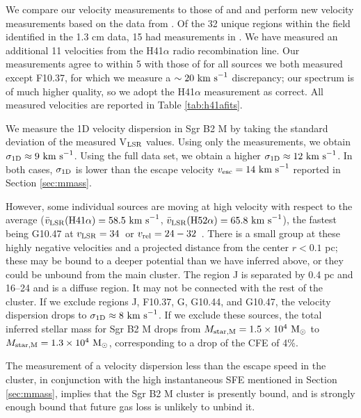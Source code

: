 \documentclass[twocolumn]{aastex62}
\begin{document}
We compare our velocity measurements to those of \citet{De-Pree2011a} and
\citet{De-Pree1996a} and perform  new velocity measurements based on the
data from \citet{Ginsburg2018a}.  Of the 32 unique \hii regions within the field
identified in the \citet{Gaume1995a} 1.3 cm data, 
15 had measurements in \citet{De-Pree2011a}.  We have measured an additional 11
velocities from the H41$\alpha$ radio recombination line.  Our measurements
agree to within 5 \kms with those of \citet{De-Pree2011a} for all sources we
both measured except F10.37, for which we measure a $\sim20~\textrm{km~s}^{-1}$ discrepancy;
our spectrum is of much higher quality, so we adopt the H41$\alpha$ measurement
as correct.  All measured velocities are reported in Table \ref{tab:h41afits}.

We measure the 1D velocity dispersion in Sgr B2 M by taking the standard
deviation of the measured V$_{\rm LSR}$ values.  Using only the
\citet{De-Pree2011a} measurements, we obtain $\sigma_{\rm 1D}\approx9~\textrm{km~s}^{-1}$.  Using
the full data set, we obtain a higher $\sigma_{\rm 1D}\approx12~\textrm{km~s}^{-1}$.  In both
cases, $\sigma_{\rm 1D}$ is  lower than the escape velocity
$v_{\rm esc}=14~\textrm{km~s}^{-1}$ reported in Section \ref{sec:mmass}.

However, some individual sources are moving at high velocity with respect to
the average ($\bar{v}_{\rm LSR}(\rm H41\alpha) = 58.5~\textrm{km~s}^{-1}$, $\bar{v}_{\rm LSR}(\rm H52\alpha)
= 65.8~\textrm{km~s}^{-1}$), the fastest being G10.47 at $v_{\rm LSR}=34$~\kms or
$v_{\rm rel}=24-32$~\kms.  There is a small group at these highly negative
velocities and a projected distance from the center $r<0.1$ pc; these may be
bound to a deeper potential than we have inferred above, or they could be unbound
from the main cluster.
The \hii region J is separated by 0.4 pc and 16--24 \kms and is a diffuse \hii
region.  It may not be connected with the rest of the cluster.
If we exclude regions J, F10.37, G, G10.44, and G10.47, the velocity dispersion
drops to $\sigma_{\rm 1D}\approx8~\textrm{km~s}^{-1}$.  If we exclude these sources, the total
inferred stellar mass for Sgr B2 M drops from $M_{\rm star,M} = 1.5\times10^{4}~\mathrm{M}_{\odot}$ to
$M_{\rm star,M}=1.3\times10^{4}~\mathrm{M}_{\odot}$, corresponding to a drop of the CFE of 4\%.

The measurement of a velocity dispersion less than the escape speed in the cluster,
in conjunction with the high instantaneous SFE mentioned in Section \ref{sec:mmass},
implies that the Sgr B2 M cluster is presently bound, and is strongly enough
bound that future gas loss is unlikely to unbind it.
\end{document}
